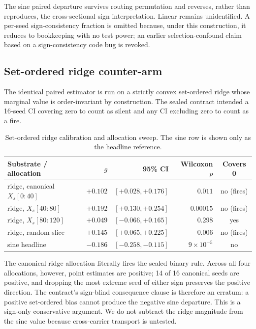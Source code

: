 \documentclass{article}
\begin{document}
The sine paired departure survives routing permutation and reverses, rather than reproduces, the
cross-sectional sign interpretation. Linear remains unidentified. A per-seed sign-consistency
fraction is omitted because, under this construction, it reduces to bookkeeping with no test power;
an earlier selection-confound claim based on a sign-consistency code bug is revoked.

\subsection{Set-ordered ridge counter-arm}
The identical paired estimator is run on a strictly convex set-ordered ridge whose marginal value is
order-invariant by construction. The sealed contract intended a 16-seed CI covering zero to count
as silent and any CI excluding zero to count as a fire.

\begin{table}[t]
\centering\footnotesize
\caption{Set-ordered ridge calibration and allocation sweep. The sine row is shown only as the
headline reference.}
\label{tab:ridge}
\begin{tabular}{lrrrc}
\toprule
Substrate / allocation & $g$ & 95\% CI & Wilcoxon $p$ & Covers 0 \\
\midrule
ridge, canonical $X_s[0{:}40]$ & $+0.102$ & $[+0.028,+0.176]$ & $0.011$ & no (fires) \\
ridge, $X_s[40{:}80]$ & $+0.192$ & $[+0.130,+0.254]$ & $0.00015$ & no (fires) \\
ridge, $X_s[80{:}120]$ & $+0.049$ & $[-0.066,+0.165]$ & $0.298$ & yes \\
ridge, random slice & $+0.145$ & $[+0.065,+0.225]$ & $0.006$ & no (fires) \\
sine headline & $-0.186$ & $[-0.258,-0.115]$ & $9\times10^{-5}$ & no \\
\bottomrule
\end{tabular}
\end{table}

The canonical ridge allocation literally fires the sealed binary rule. Across all four allocations,
however, point estimates are positive; 14 of 16 canonical seeds are positive, and dropping the most
extreme seed of either sign preserves the positive direction. The contract's sign-blind consequence
clause is therefore an erratum: a positive set-ordered bias cannot produce the negative sine
departure. This is a sign-only conservative argument. We do not subtract the ridge magnitude from
the sine value because cross-carrier transport is untested.
\end{document}

